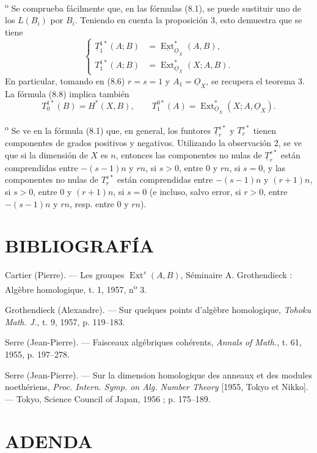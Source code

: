 \documentclass[11pt,twoside,openany]{book}
\numberwithin{equation}{section}
\newcommand{\src}[1]{%
  \phantomsection\hypertarget{src:#1}{}%
  \marginpar{\raggedleft\footnotesize\sffamily #1}%
}
\newcommand{\Osh}{\underline{O}}
\newcommand{\Extsh}{\underline{\operatorname{Ext}}}
\theoremstyle{plain}
\theoremstyle{definition}
\theoremstyle{remark}
\newcommand{\FgaUnitKey}{frontmatter}
\renewcommand{\src}[1]{%
  \phantomsection\hypertarget{src:\FgaUnitKey:#1}{}%
  \marginpar{\raggedleft\footnotesize\sffamily #1}%
}
\theoremstyle{plain}
\theoremstyle{definition}
\theoremstyle{remark}
\begin{document}
\medskip
{}\textsuperscript{o} Se comprueba fácilmente que, en las fórmulas
(8.1), se puede sustituir uno de los $L(B_i)$ por $B_i$. Teniendo en cuenta la
proposición 3, esto demuestra que se tiene
\begin{equation}\tag{8.8}
\left\{
\begin{aligned}
  \underline{T}_{1}^{1*}(A;B)&=\Extsh_{\Osh_X}^{*}(A,B),\\
  T_{1}^{1*}(A;B)&=\operatorname{Ext}_{\Osh_X}^{*}(X;A,B).
\end{aligned}
\right.
\end{equation}
En particular, tomando en (8.6) $r=s=1$ y $A_1=\Osh_X$, se recupera el
teorema 3. La fórmula (8.8) implica también
\[
  T_{0}^{1*}(B)=H^{*}(X,B),
  \qquad
  T_{1}^{0*}(A)=\operatorname{Ext}_{\Osh_X}^{*}(X;A,\Osh_X).
\]

\medskip
{}\textsuperscript{o} Se ve en la fórmula (8.1) que, en general, los
funtores $\underline{T}_{r}^{s*}$ y $T_{r}^{s*}$ tienen componentes de
grados positivos y negativos. Utilizando la observación 2, se ve que si la
dimensión de $X$ es $n$, entonces las componentes no nulas de
$\underline{T}_{r}^{s*}$ están comprendidas entre $-(s-1)n$ y $rn$, si $s>0$,
entre $0$ y $rn$, si $s=0$, y las componentes no nulas de $T_{r}^{s*}$
están comprendidas entre $-(s-1)n$ y $(r+1)n$, si $s>0$, entre $0$ y $(r+1)n$,
si $s=0$ (e incluso, salvo error, si $r>0$, entre $-(s-1)n$ y $rn$, resp. entre
$0$ y $rn$).

\section*{BIBLIOGRAFÍA}

\noindent[1] Cartier (Pierre). --- Les groupes
$\operatorname{Ext}^{s}(A,B)$, Séminaire A. Grothendieck : Algèbre homologique,
t. 1, 1957, n\textsuperscript{o} 3.

\noindent[2] Grothendieck (Alexandre). --- Sur quelques points d'algèbre
homologique, \emph{Tohoku Math. J.}, t. 9, 1957, p. 119--183.

\noindent[3] Serre (Jean-Pierre). --- Faisceaux algébriques cohérents,
\emph{Annals of Math.}, t. 61, 1955, p. 197--278.

\noindent[4] Serre (Jean-Pierre). --- Sur la dimension homologique des anneaux
et des modules noethériens, \emph{Proc. Intern. Symp. on Alg. Number Theory}
[1955, Tokyo et Nikko]. --- Tokyo, Science Council of Japan, 1956 ;
p. 175--189.

\clearpage
\src{193}
\section*{ADENDA}
\end{document}
